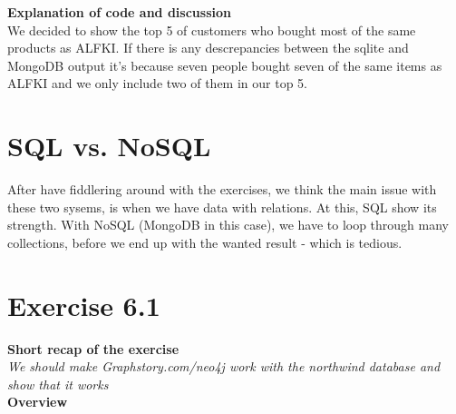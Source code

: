 \documentclass{article}
\begin{document}
\textbf{Explanation of code and discussion}\\
We decided to show the top 5 of customers who bought most of the same products as ALFKI. 
If there is any descrepancies between the sqlite and MongoDB output it's because seven people bought seven of the same items as ALFKI and we only include two of them in our top 5.

\section{SQL vs. NoSQL}
After have fiddlering around with the exercises, we think the main issue with these two sysems, is when we have data with relations. At this, SQL show its strength. With NoSQL (MongoDB in this case), we have to loop through many collections, before we end up with the wanted result - which is tedious. 


\section{Exercise 6.1}
\textbf{Short recap of the exercise}\\
\textit{We should make Graphstory.com/neo4j work with the northwind database and show that it works}\\

\textbf{Overview}\\
\end{document}
